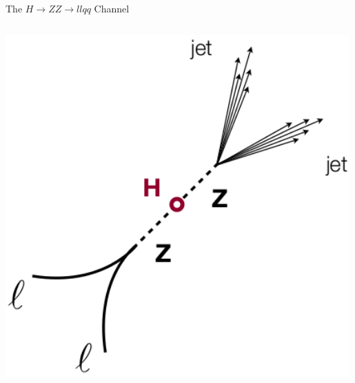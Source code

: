 \begin{frame}{The $H \rightarrow ZZ \rightarrow llqq$ Channel}
\begin{center}
\begin{columns}
\begin{column}{0.3\textwidth}
    \includegraphics[width=0.99\textwidth]{images/h_zz_2l2q.png}
  \end{column}
\end{columns}
\end{center}
\end{frame}







